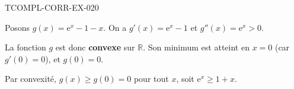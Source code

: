 \begin{corrige}{TCOMPL-CORR-EX-020}


Posons $g(x) = \mathrm{e}^x - 1 - x$. On a $g'(x) = \mathrm{e}^x - 1$ et $g''(x) = \mathrm{e}^x > 0$.

La fonction $g$ est donc \textbf{convexe} sur $\mathbb{R}$. Son minimum est atteint en $x=0$ (car $g'(0)=0$), et $g(0) = 0$.

Par convexité, $g(x) \geq g(0) = 0$ pour tout $x$, soit $\mathrm{e}^x \geq 1 + x$.

\end{corrige}
